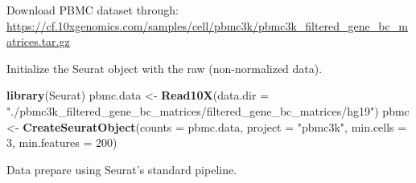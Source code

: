 \documentclass[
  12pt,
]{book}
\newenvironment{Shaded}{\begin{snugshade}}{\end{snugshade}}
\newcommand{\AttributeTok}[1]{\textcolor[rgb]{0.13,0.29,0.53}{#1}}
\newcommand{\DecValTok}[1]{\textcolor[rgb]{0.00,0.00,0.81}{#1}}
\newcommand{\FunctionTok}[1]{\textcolor[rgb]{0.13,0.29,0.53}{\textbf{#1}}}
\newcommand{\NormalTok}[1]{#1}
\newcommand{\OtherTok}[1]{\textcolor[rgb]{0.56,0.35,0.01}{#1}}
\newcommand{\StringTok}[1]{\textcolor[rgb]{0.31,0.60,0.02}{#1}}
\begin{document}
Download PBMC dataset through: \url{https://cf.10xgenomics.com/samples/cell/pbmc3k/pbmc3k_filtered_gene_bc_matrices.tar.gz}

Initialize the Seurat object with the raw (non-normalized data).

\begin{Shaded}
\begin{Highlighting}[]
\FunctionTok{library}\NormalTok{(Seurat)}
\NormalTok{pbmc.data }\OtherTok{\textless{}{-}} \FunctionTok{Read10X}\NormalTok{(}\AttributeTok{data.dir =} \StringTok{"./pbmc3k\_filtered\_gene\_bc\_matrices/filtered\_gene\_bc\_matrices/hg19"}\NormalTok{)}
\NormalTok{pbmc }\OtherTok{\textless{}{-}} \FunctionTok{CreateSeuratObject}\NormalTok{(}\AttributeTok{counts =}\NormalTok{ pbmc.data, }\AttributeTok{project =} \StringTok{"pbmc3k"}\NormalTok{, }\AttributeTok{min.cells =} \DecValTok{3}\NormalTok{, }\AttributeTok{min.features =} \DecValTok{200}\NormalTok{)}
\end{Highlighting}
\end{Shaded}

Data prepare using Seurat's standard pipeline.
\end{document}
